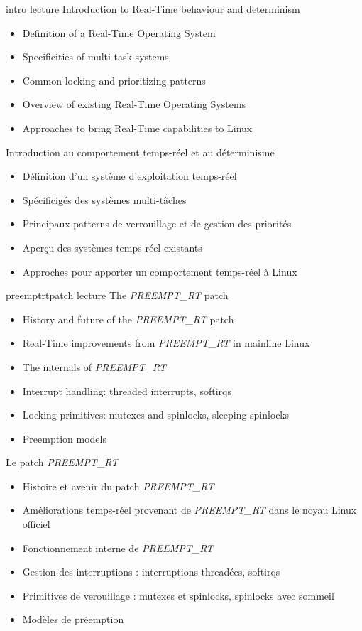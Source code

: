 {intro}
{lecture}
{Introduction to Real-Time behaviour and determinism}
{
  \begin{itemize}
  \item Definition of a Real-Time Operating System
  \item Specificities of multi-task systems
  \item Common locking and prioritizing patterns
  \item Overview of existing Real-Time Operating Systems
  \item Approaches to bring Real-Time capabilities to Linux
  \end{itemize}
}
{Introduction au comportement temps-réel et au déterminisme}
{
  \begin{itemize}
  \item Définition d'un système d'exploitation temps-réel
  \item Spécificigés des systèmes multi-tâches
  \item Principaux patterns de verrouillage et de gestion des priorités
  \item Aperçu des systèmes temps-réel existants
  \item Approches pour apporter un comportement temps-réel à Linux
  \end{itemize}
}
{preemptrtpatch}
{lecture}
{The {\em PREEMPT\_RT} patch}
{
  \begin{itemize}
  \item History and future of the {\em PREEMPT\_RT} patch
  \item Real-Time improvements from {\em PREEMPT\_RT} in mainline Linux
  \item The internals of {\em PREEMPT\_RT}
  \item Interrupt handling: threaded interrupts, softirqs
  \item Locking primitives: mutexes and spinlocks, sleeping spinlocks
  \item Preemption models
  \end{itemize}
}
{Le patch {\em PREEMPT\_RT}}
{
  \begin{itemize}
  \item Histoire et avenir du patch {\em PREEMPT\_RT}
  \item Améliorations temps-réel provenant de {\em PREEMPT\_RT} dans le noyau Linux officiel
  \item Fonctionnement interne de {\em PREEMPT\_RT}
  \item Gestion des interruptions : interruptions threadées, softirqs
  \item Primitives de verouillage : mutexes et spinlocks, spinlocks avec sommeil
  \item Modèles de préemption
  \end{itemize}
}
